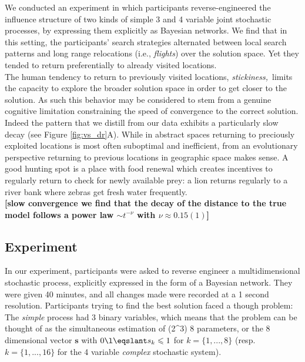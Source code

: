 We conducted an experiment in which participants reverse-engineered the influence structure of two kinds of simple 3 and 4 variable joint stochastic processes, by expressing them explicitly as Bayesian networks. We find that in this setting, the participants’ search strategies alternated between local search patterns and long range relocations (i.e., {\it flights}) over the solution space. Yet they tended to return preferentially to already visited locations.\\

The human tendency to return to previously visited locations, {\it stickiness,}\
 limits the capacity to explore the broader solution space in order to get closer to the solution. As such this behavior may be considered to stem from a genuine cognitive limitation constraining the speed of convergence to the correct solution.  Indeed the pattern that we distill from our data exhibits a particularly slow decay (see Figure \ref{fig:vs_dr}A).  While in abstract spaces returning to preciously exploited locations is most often suboptimal and inefficient, from an evolutionary perspective returning to previous locations in geographic space makes sense.  A good hunting spot is a place with food renewal which creates incentives to regularly return to check for newly available prey: a lion returns regularly to a river bank where zebras get fresh water frequently. \\

 {\bf [slow convergence we find that the decay of the distance to the true model follows a power law $\sim t^{-\nu}$ with $\nu \approx 0.15(1)$]}

\subsection{Experiment}
In our experiment, participants were asked to reverse engineer a multidimensional stochastic process, explicitly expressed in the form of a Bayesian network. They were given 40 minutes, and all changes made were recorded at a 1 second resolution. Participants trying to find the best solution faced a though problem: The {\it simple} process had 3 binary variables, which means that the problem can be thought of as the simultaneous estimation of (2^3) 8 parameters, or the 8 dimensional vector $\mathbf{s}$ with $0 \l\eqslant s_k  \leqslant 1$ for $k = \{1,...,8\}$ (resp. $k = \{1,..., 16\}$ for the 4 variable {\it complex} stochastic system).


